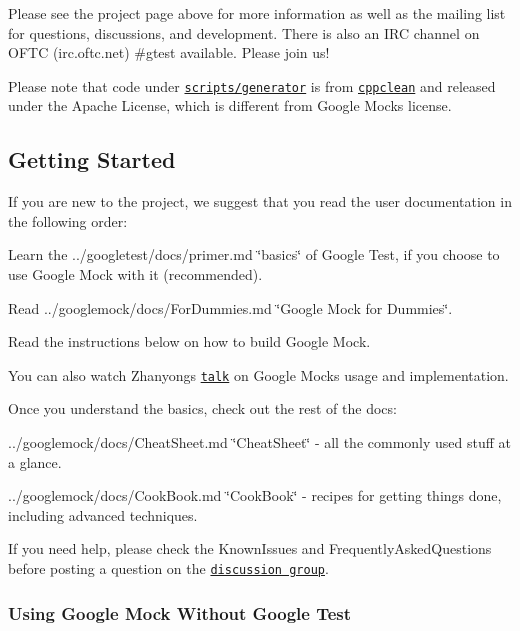 Please see the project page above for more information as well as the mailing list for questions, discussions, and development. There is also an I\+RC channel on O\+F\+TC (irc.\+oftc.\+net) \#gtest available. Please join us!

Please note that code under \href{scripts/generator/}{\tt scripts/generator} is from \href{http://code.google.com/p/cppclean/}{\tt cppclean} and released under the Apache License, which is different from Google Mock\textquotesingle{}s license.

\subsection*{Getting Started}

If you are new to the project, we suggest that you read the user documentation in the following order\+:


\begin{DoxyItemize}
\item Learn the ../googletest/docs/primer.md \char`\"{}basics\char`\"{} of Google Test, if you choose to use Google Mock with it (recommended).
\item Read ../googlemock/docs/\+For\+Dummies.md \char`\"{}\+Google Mock for Dummies\char`\"{}.
\item Read the instructions below on how to build Google Mock.
\end{DoxyItemize}

You can also watch Zhanyong\textquotesingle{}s \href{http://www.youtube.com/watch?v=sYpCyLI47rM}{\tt talk} on Google Mock\textquotesingle{}s usage and implementation.

Once you understand the basics, check out the rest of the docs\+:


\begin{DoxyItemize}
\item ../googlemock/docs/\+Cheat\+Sheet.md \char`\"{}\+Cheat\+Sheet\char`\"{} -\/ all the commonly used stuff at a glance.
\item ../googlemock/docs/\+Cook\+Book.md \char`\"{}\+Cook\+Book\char`\"{} -\/ recipes for getting things done, including advanced techniques.
\end{DoxyItemize}

If you need help, please check the Known\+Issues and Frequently\+Asked\+Questions before posting a question on the \href{http://groups.google.com/group/googlemock}{\tt discussion group}.

\subsubsection*{Using Google Mock Without Google Test}

